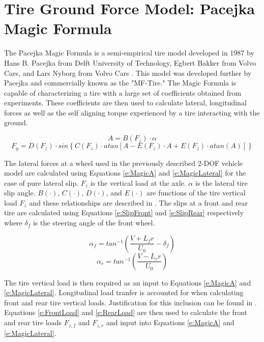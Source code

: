 \documentclass[12pt,onecolumn]{report}
\begin{document}
\section{Tire Ground Force Model: Pacejka Magic Formula}\label{s:Pacejka}

The Pacejka Magic Formula is a semi-empirical tire model developed in 1987 by Hans B. Pacejka from Delft University of Technology, Egbert Bakker from Volvo Cars, and Lars Nyborg from Volvo Cars \cite{TireSensitivityStudy}. This model was developed further by Pacejka and commercially known as the "MF-Tire." The Magic Formula is capable of characterizing a tire with a large set of coefficients obtained from experiments. These coefficients are then used to calculate lateral, longitudinal forces as well as the self aligning torque experienced by a tire interacting with the ground. 

\begin{equation}\label{e:MagicA}
A = B\left(F_z\right)\cdot\alpha 
\end{equation}
\begin{equation}\label{e:MagicLateral}
F_y = D\left(F_z\right)\cdot sin\left\{C\left(F_z\right)\cdot atan\left[A-E\left(F_z\right)\cdot A+E\left(F_z\right)\cdot atan\left(A\right)\right]\right\}
\end{equation}

The lateral forces at a wheel used in the previously described 2-DOF vehicle model are calculated using Equations \ref{e:MagicA} and \ref{e:MagicLateral} for the case of pure lateral slip.  $F_{z}$ is the vertical load at the axle. $\alpha$ is the lateral tire slip angle. $B\left(\cdot\right)$, $C\left(\cdot\right)$, $D\left(\cdot\right)$, and $E\left(\cdot\right)$ are functions of the tire vertical load $F_{z}$ and these relationships are described in \cite{Pacejka2012}. The slips at a front and rear tire are calculated using Equations \ref{e:SlipFront} and \ref{e:SlipRear} respectively where $\delta_f$ is the steering angle of the front wheel.

\begin{equation}\label{e:SlipFront}
\alpha_f = tan^{-1}\left( \frac{V+L_{f}r}{U_0} - \delta_f\right) 
\end{equation}
\begin{equation}\label{e:SlipRear}
\alpha_r = tan^{-1}\left( \frac{V-L_{r}r}{U_0}\right)
\end{equation}

The tire vertical load is then required as an input to Equations \ref{e:MagicA} and \ref{e:MagicLateral}. Longitudinal load tranfer is accounted for when calculating front and rear tire vertical loads. Justification for this inclusion can be found in \cite{ModelFidelity2016}. Equations \ref{e:FrontLoad} and \ref{e:RearLoad} are then used to calculate the front and rear tire loads $F_{z,f}$ and $F_{z,r}$ and input into Equations \ref{e:MagicA} and \ref{e:MagicLateral}.
\end{document}
